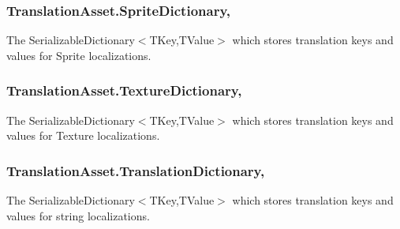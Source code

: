 \subsubsection[{\texorpdfstring{Sprite\+Dictionary}{SpriteDictionary}}]{ Translation\+Asset.\+Sprite\+Dictionary\hspace{0.3cm}{\ttfamily [get]}, {\ttfamily [set]}}\hypertarget{class_translation_asset_a360f0776ee8f75f6d24e46543f47f029}{}\label{class_translation_asset_a360f0776ee8f75f6d24e46543f47f029}


The Serializable\+Dictionary$<$\+T\+Key,\+T\+Value$>$ which stores translation keys and values for Sprite localizations. 

\subsubsection[{\texorpdfstring{Texture\+Dictionary}{TextureDictionary}}]{ Translation\+Asset.\+Texture\+Dictionary\hspace{0.3cm}{\ttfamily [get]}, {\ttfamily [set]}}\hypertarget{class_translation_asset_a044032e0de74a8c42a74d76258c479f1}{}\label{class_translation_asset_a044032e0de74a8c42a74d76258c479f1}


The Serializable\+Dictionary$<$\+T\+Key,\+T\+Value$>$ which stores translation keys and values for Texture localizations. 

\subsubsection[{\texorpdfstring{Translation\+Dictionary}{TranslationDictionary}}]{ Translation\+Asset.\+Translation\+Dictionary\hspace{0.3cm}{\ttfamily [get]}, {\ttfamily [set]}}\hypertarget{class_translation_asset_a313f9943f1dc9f48fb45633452093f1b}{}\label{class_translation_asset_a313f9943f1dc9f48fb45633452093f1b}


The Serializable\+Dictionary$<$\+T\+Key,\+T\+Value$>$ which stores translation keys and values for string localizations. 

